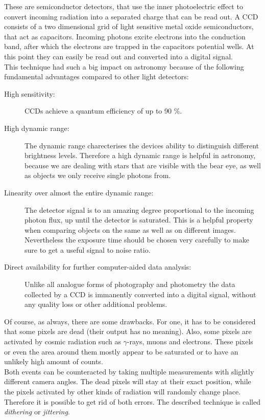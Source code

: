  These are semiconductor detectors, that use the inner photoelectric effect to convert incoming radiation into a separated charge that can be read out. A CCD consists of a two dimensional grid of light sensitive metal oxide semiconductors, that act as capacitors. Incoming photons excite electrons into the conduction band, after which the electrons are trapped in the capacitors potential wells. At this point they can easily be read out and converted into a digital signal. \\
This technique had such a big impact on astronomy because of the following fundamental advantages compared to other light detectors:

\begin{description}
	\item[High sensitivity:] CCDs achieve a quantum efficiency of up to 90 \%.
	\item[High dynamic range:] The dynamic range charecterises the devices ability to distinguish different brightness levels.  Therefore a high dynamic range is helpful in astronomy, because we are dealing with stars that are visible with the bear eye, as well as objects we only receive single photons from.
	\item[Linearity over almost the entire dynamic range:] The detector signal is to an amazing degree proportional to the incoming photon flux, up until the detector is saturated. This is a helpful property when comparing objects on the same as well as on different images. Nevertheless the exposure time should be chosen very carefully to make sure to get a useful signal to noise ratio.
	\item[Direct availability for further computer-aided data analysis:] Unlike all analogue forms of photography and photometry the data collected by a CCD is immanently converted into a digital signal, without any quality loss or other additional problems. 
\end{description}

Of course, as always, there are some drawbacks. For one, it has to be considered that some pixels are dead (their output has no meaning). Also, some pixels are activated by cosmic radiation such as $\gamma$-rays, muons and electrons. These pixels or even the area around them mostly appear to be saturated or to have an unlikely high amount of counts.\\
Both events can be counteracted by taking multiple measurements with slightly different camera angles. The dead pixels will stay at their exact position, while the pixels activated by other kinds of radiation will randomly change place. Therefore it is possible to get rid of both errors. The described technique is called \textit{dithering} or \textit{jittering}.

